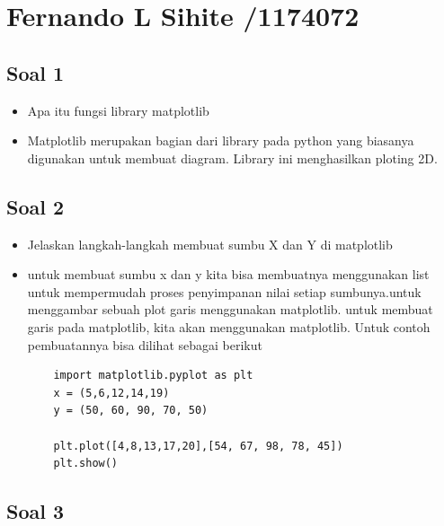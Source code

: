 \section{Fernando L Sihite /1174072}
	\subsection{Soal 1} 
		\begin{itemize}
			\item Apa itu fungsi library matplotlib 

			\item Matplotlib merupakan bagian dari library pada python yang biasanya digunakan untuk membuat diagram. Library ini menghasilkan ploting 2D.
		\end{itemize}

	\subsection{Soal 2}
	\begin{itemize}
	\item Jelaskan langkah-langkah membuat sumbu X dan Y di matplotlib 
	
	\item untuk membuat sumbu x dan y kita bisa membuatnya menggunakan list untuk mempermudah proses penyimpanan nilai setiap sumbunya.untuk menggambar sebuah plot garis menggunakan matplotlib. untuk membuat garis pada matplotlib, kita akan menggunakan matplotlib.
Untuk contoh pembuatannya bisa dilihat sebagai berikut 

	
	\begin{verbatim}
	import matplotlib.pyplot as plt	
	x = (5,6,12,14,19)
	y = (50, 60, 90, 70, 50)
	
	plt.plot([4,8,13,17,20],[54, 67, 98, 78, 45])
	plt.show()
    \end{verbatim}
    
	\end{itemize}
	\subsection{Soal 3}
	

